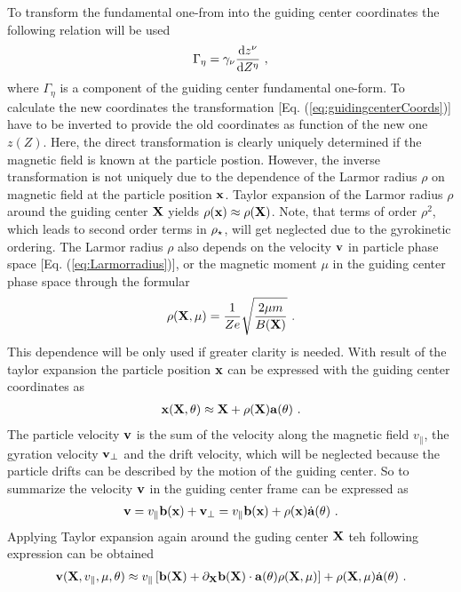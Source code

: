 To transform the fundamental one-from into the guiding center coordinates the following relation will be used
\begin{gather}
    \Gamma_\eta = \gamma_\nu \frac{\mathrm{d}z^\nu}{\mathrm{d}Z^\eta}~,
    \label{eq:trafoLagrangian}
\end{gather} 
where $\Gamma_\eta$ is a component of the guiding center fundamental one-form. To calculate the new coordinates the transformation [Eq. (\ref{eq:guidingcenterCoords})] have to be inverted to provide the old coordinates as function of the new one $z(Z)$. Here, the direct transformation is clearly uniquely determined if the magnetic field is known at the particle postion. However, the inverse transformation is not uniquely due to the dependence of the Larmor radius $\rho$ on magnetic field at the particle position $\boldsymbol{\mathbf{x}}$. Taylor expansion of the Larmor radius $\rho$ around the guiding center $\boldsymbol{\mathbf{X}}$ yields $\rho(\boldsymbol{\mathbf{x}}) \approx \rho(\boldsymbol{\mathbf{X}})$. Note, that terms of order $\rho^2$, which leads to second order terms in $\rho_\star$, will get neglected due to the gyrokinetic ordering. The Larmor radius $\rho$ also depends on the velocity $\boldsymbol{\mathbf{v}}$ in particle phase space [Eq. (\ref{eq:Larmorradius})], or the magnetic moment $\mu$ in the guiding center phase space through the formular
\begin{gather}
    \rho(\boldsymbol{\mathbf{X}}, \mu) = \frac{1}{Ze} \sqrt{\frac{2\mu m}{B(\boldsymbol{\mathbf{X}})}}~.
    \label{eq:guidingcenterLarmorradius}
\end{gather}
This dependence will be only used if greater clarity is needed. With result of the taylor expansion the particle position $\boldsymbol{\mathbf{x}}$ can be expressed with the guiding center coordinates as 
\begin{gather}
    \boldsymbol{\mathbf{x}}(\boldsymbol{\mathbf{X}},\theta) \approx \boldsymbol{\mathbf{X}} + \rho(\boldsymbol{\mathbf{X}})\boldsymbol{\mathbf{a}}(\theta)~.
    \label{eq:guidingcenterParticleCoord}
\end{gather}
The particle velocity $\boldsymbol{\mathbf{v}}$ is the sum of the velocity along the magnetic field $v_\parallel$, the gyration velocity $\boldsymbol{\mathbf{v}}_\perp$ and the drift velocity, which will be neglected because the particle drifts can be described by the motion of the guiding center. So to summarize the velocity $\boldsymbol{\mathbf{v}}$ in the guiding center frame can be expressed as 
\begin{gather}
    \boldsymbol{\mathbf{v}} = v_\parallel \boldsymbol{\mathbf{b}}(\boldsymbol{\mathbf{x}}) + \boldsymbol{\mathbf{v}}_\perp = v_\parallel \boldsymbol{\mathbf{b}}(\boldsymbol{\mathbf{x}}) + \rho(\boldsymbol{\mathbf{x}}) \dot{\boldsymbol{\mathbf{a}}}(\theta)~.
    \label{eq:guidingcenterVelocity}
\end{gather}
Applying Taylor expansion again around the guding center $\boldsymbol{\mathbf{X}}$ teh following expression can be obtained
\begin{gather}
    \boldsymbol{\mathbf{v}}(\boldsymbol{\mathbf{X}}, v_\parallel, \mu, \theta) \approx v_\parallel \left[\boldsymbol{\mathbf{b}}(\boldsymbol{\mathbf{X}}) + \partial_{\boldsymbol{\mathbf{X}}} \boldsymbol{\mathbf{b}}(\boldsymbol{\mathbf{X}}) \cdot \boldsymbol{\mathbf{a}}(\theta)\rho(\boldsymbol{\mathbf{X}},\mu) \right] + \rho(\boldsymbol{\mathbf{X}},\mu)\dot{\boldsymbol{\mathbf{a}}}(\theta)~.
    \label{eq:guidingcenterVelocityCoord}
\end{gather}

